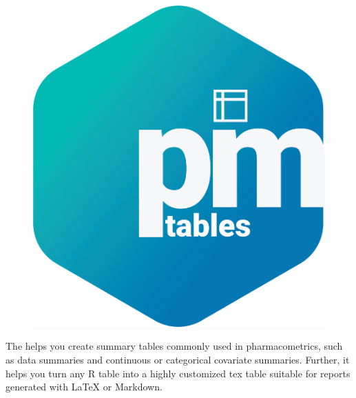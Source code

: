 \documentclass[portrait,fontscale=0.46,paperwidth=36in,paperheight=48in]{baposter}
\begin{document}
\begin{poster}
{\begin{minipage}[c]{0.333\linewidth}
\begin{demobx}[]
		\begin{figure}
			\vspace{-0.45cm}
			\includegraphics[scale=0.175]{"images/metrum_pmtables_git_logo.png"} 
		\end{figure}
		The  helps you create summary tables commonly used in pharmacometrics, such as data summaries and continuous or categorical covariate summaries. Further, it helps you turn any R table into a highly customized tex table suitable for reports generated with LaTeX or Markdown. 
		\vspace{0.4cm}


\end{demobx}
\end{minipage}}
\end{poster}
\end{document}
